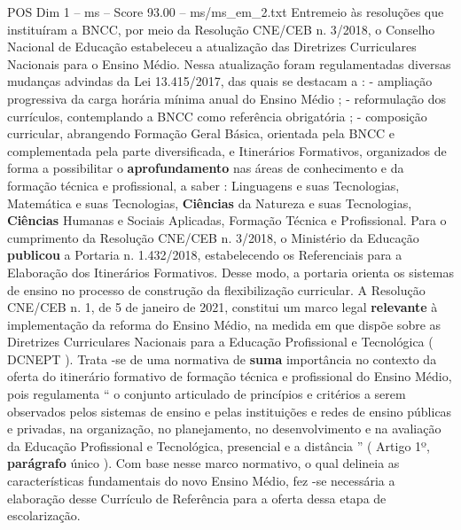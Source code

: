 \begin{textsample}{POS Dim 1 – ms – Score 93.00 – ms/ms\_em\_2.txt}
Entremeio às resoluções que instituíram a BNCC, por meio da Resolução CNE/CEB n. 3/2018, o Conselho Nacional de Educação estabeleceu a atualização das Diretrizes Curriculares Nacionais para o Ensino Médio.
Nessa atualização foram regulamentadas diversas mudanças advindas da Lei 13.415/2017, das quais se destacam a : - ampliação progressiva da carga horária mínima anual do Ensino Médio ; - reformulação dos currículos, contemplando a BNCC como referência obrigatória ; - composição curricular, abrangendo Formação Geral Básica, orientada pela BNCC e complementada pela parte diversificada, e Itinerários Formativos, organizados de forma a possibilitar o \textbf{aprofundamento} nas áreas de conhecimento e da formação técnica e profissional, a saber : Linguagens e suas Tecnologias, Matemática e suas Tecnologias, \textbf{Ciências} da Natureza e suas Tecnologias, \textbf{Ciências} Humanas e Sociais Aplicadas, Formação Técnica e Profissional.
Para o cumprimento da Resolução CNE/CEB n. 3/2018, o Ministério da Educação \textbf{publicou} a Portaria n. 1.432/2018, estabelecendo os Referenciais para a Elaboração dos Itinerários Formativos.
Desse modo, a portaria orienta os sistemas de ensino no processo de construção da flexibilização curricular.
A Resolução CNE/CEB n. 1, de 5 de janeiro de 2021, constitui um marco legal \textbf{relevante} à implementação da reforma do Ensino Médio, na medida em que dispõe sobre as Diretrizes Curriculares Nacionais para a Educação Profissional e Tecnológica ( DCNEPT ).
Trata -se de uma normativa de \textbf{suma} importância no contexto da oferta do itinerário formativo de formação técnica e profissional do Ensino Médio, pois regulamenta “ o conjunto articulado de princípios e critérios a serem observados pelos sistemas de ensino e pelas instituições e redes de ensino públicas e privadas, na organização, no planejamento, no desenvolvimento e na avaliação da Educação Profissional e Tecnológica, presencial e a distância ” ( Artigo 1º, \textbf{parágrafo} único ).
Com base nesse marco normativo, o qual delineia as características fundamentais do novo Ensino Médio, fez -se necessária a elaboração desse Currículo de Referência para a oferta dessa etapa de escolarização.

\end{textsample}
